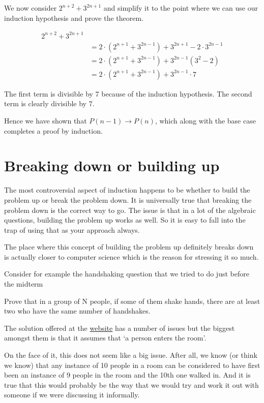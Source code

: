 \documentclass[12pt]{article}
\begin{document}
We now consider $2^{n+2} +3^{2n+1}$ and simplify it to the point where we can use our induction hypothesis and prove the theorem.

\begin{align*}
2^{n+2} + 3^{2n+1} \\
&= 2\cdot(2^{n+1} + 3^{2n-1}) + 3^{2n+1} - 2\cdot 3^{2n-1} \\
&= 2\cdot(2^{n+1} + 3^{2n-1}) + 3^{2n-1}(3^2 - 2) \\
&= 2\cdot(2^{n+1} + 3^{2n-1}) + 3^{2n-1}\cdot 7 
\end{align*}

The first term is divisible by 7 because of the induction hypothesis. The second term is clearly divisible by 7.

Hence we have shown that $P(n-1) \rightarrow P(n)$, which along with the base case completes a proof by induction.

\section*{Breaking down or building up}

The most controversial aspect of induction happens to be whether to build the problem up or break the problem down. It is universally true that breaking the problem down is the correct way to go. The issue is that in a lot of the algebraic questions, building the problem up works as well. So it is easy to fall into the trap of using that as your approach always. 

The place where this concept of building the problem up definitely breaks down is actually closer to computer science which is the reason for stressing it so much.

Consider for example the handshaking question that we tried to do just before the midterm

\begin{Exercise*}
Prove that in a group of N people,
if some of them shake hands,
there are at least two who have the same number of handshakes. 
\end{Exercise*}

The solution offered at the \href{http://www.gottfriedville.net/mathprob/comb-shakes.html}{website} has a number of issues but the biggest amongst them is that it assumes that `a person enters the room'. 

On the face of it, this does not seem like a big issue. After all, we know (or think we know) that any instance of 10 people in a room can be considered to have first been an instance of 9 people in the room and the 10th one walked in. And it is true that this would probably be the way that we would try and work it out with someone if we were discussing it informally.
\end{document}

